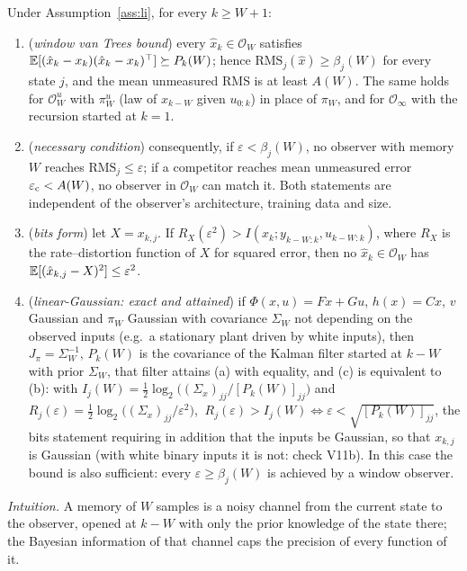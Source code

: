 \begin{lemma}\label{lem:li-window}
Under Assumption~\ref{ass:li}, for every $k\ge W+1$:
\begin{enumerate}[leftmargin=2.2em]
\item[(a)] (\emph{window van Trees bound}) every $\hat x_k\in\mathcal O_W$ satisfies
$\mathbb E[(\hat x_k-x_k)(\hat x_k-x_k)^\top]\succeq P_k(W)$; hence $\mathrm{RMS}_j(\hat x)\ge\beta_j(W)$ for every state $j$, and
the mean unmeasured RMS is at least $A(W)$. The same holds for $\mathcal O^u_W$ with $\pi^u_W$ (law of $x_{k-W}$
given $u_{0:k}$) in place of $\pi_W$, and for $\mathcal O_\infty$ with the recursion started at $k=1$.
\item[(b)] (\emph{necessary condition}) consequently, if $\varepsilon<\beta_j(W)$, no observer with memory $W$
reaches $\mathrm{RMS}_j\le\varepsilon$; if a competitor reaches mean unmeasured error $\varepsilon_{\rm c}<A(W)$, no
observer in $\mathcal O_W$ can match it. Both statements are independent of the observer's architecture,
training data and size.
\item[(c)] (\emph{bits form}) let $X=x_{k,j}$. If $R_X(\varepsilon^2)>I(x_k;y_{k-W:k},u_{k-W:k})$, where $R_X$ is the
rate--distortion function of $X$ for squared error, then no $\hat x_k\in\mathcal O_W$ has $\mathbb E[(\hat x_{k,j}-X)^2]\le\varepsilon^2$.
\item[(d)] (\emph{linear-Gaussian: exact and attained})  if
$\Phi(x,u)=Fx+Gu$, $h(x)=Cx$, $v$ Gaussian and $\pi_W$
Gaussian with covariance $\Sigma_W$ not depending on the observed inputs (e.g.\ a stationary plant driven by white
inputs), then $J_\pi=\Sigma_W^{-1}$, $P_k(W)$ is the covariance of the Kalman filter started at $k-W$ with prior
$\Sigma_W$, that filter attains (a) with equality, and (c) is equivalent to (b): with
$I_j(W)=\tfrac12\log_2\big((\Sigma_x)_{jj}/[P_k(W)]_{jj}\big)$ and $R_j(\varepsilon)=\tfrac12\log_2\big((\Sigma_x)_{jj}/\varepsilon^2\big)$,
$\ R_j(\varepsilon)>I_j(W)\iff\varepsilon<\sqrt{[P_k(W)]_{jj}}$, the bits statement requiring in addition that the inputs be
Gaussian, so that $x_{k,j}$ is Gaussian (with white binary inputs it is not: check V11b). In this case the bound is also sufficient: every
$\varepsilon\ge\beta_j(W)$ is achieved by a window observer.
\end{enumerate}
\end{lemma}
\emph{Intuition.} A memory of $W$ samples is a noisy channel from the current state to the observer, opened at
$k-W$ with only the prior knowledge of the state there; the Bayesian information of that channel caps the precision
of every function of it.


